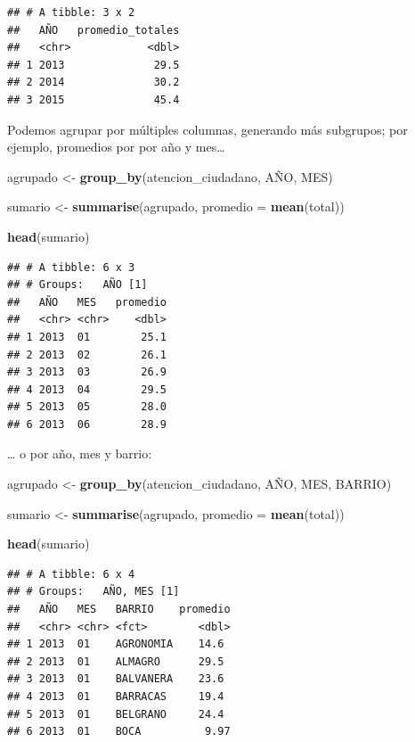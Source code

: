 \documentclass[]{book}
\newenvironment{Shaded}{\begin{snugshade}}{\end{snugshade}}
\newcommand{\KeywordTok}[1]{\textcolor[rgb]{0.13,0.29,0.53}{\textbf{#1}}}
\newcommand{\DataTypeTok}[1]{\textcolor[rgb]{0.13,0.29,0.53}{#1}}
\newcommand{\StringTok}[1]{\textcolor[rgb]{0.31,0.60,0.02}{#1}}
\newcommand{\NormalTok}[1]{#1}
\begin{document}
\begin{verbatim}
## # A tibble: 3 x 2
##   AÑO   promedio_totales
##   <chr>            <dbl>
## 1 2013              29.5
## 2 2014              30.2
## 3 2015              45.4
\end{verbatim}

Podemos agrupar por múltiples columnas, generando más subgrupos; por
ejemplo, promedios por por año y mes\ldots{}

\begin{Shaded}
\begin{Highlighting}[]
\NormalTok{agrupado <-}\StringTok{ }\KeywordTok{group_by}\NormalTok{(atencion_ciudadano, AÑO, MES)}

\NormalTok{sumario <-}\StringTok{ }\KeywordTok{summarise}\NormalTok{(agrupado, }\DataTypeTok{promedio =} \KeywordTok{mean}\NormalTok{(total))}

\KeywordTok{head}\NormalTok{(sumario)}
\end{Highlighting}
\end{Shaded}

\begin{verbatim}
## # A tibble: 6 x 3
## # Groups:   AÑO [1]
##   AÑO   MES   promedio
##   <chr> <chr>    <dbl>
## 1 2013  01        25.1
## 2 2013  02        26.1
## 3 2013  03        26.9
## 4 2013  04        29.5
## 5 2013  05        28.0
## 6 2013  06        28.9
\end{verbatim}

\ldots{} o por año, mes y barrio:

\begin{Shaded}
\begin{Highlighting}[]
\NormalTok{agrupado <-}\StringTok{ }\KeywordTok{group_by}\NormalTok{(atencion_ciudadano, AÑO, MES, BARRIO)}

\NormalTok{sumario <-}\StringTok{ }\KeywordTok{summarise}\NormalTok{(agrupado, }\DataTypeTok{promedio =} \KeywordTok{mean}\NormalTok{(total))}

\KeywordTok{head}\NormalTok{(sumario)}
\end{Highlighting}
\end{Shaded}

\begin{verbatim}
## # A tibble: 6 x 4
## # Groups:   AÑO, MES [1]
##   AÑO   MES   BARRIO    promedio
##   <chr> <chr> <fct>        <dbl>
## 1 2013  01    AGRONOMIA    14.6 
## 2 2013  01    ALMAGRO      29.5 
## 3 2013  01    BALVANERA    23.6 
## 4 2013  01    BARRACAS     19.4 
## 5 2013  01    BELGRANO     24.4 
## 6 2013  01    BOCA          9.97
\end{verbatim}
\end{document}
